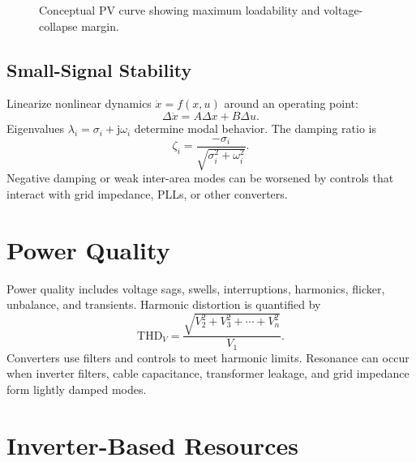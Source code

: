 \documentclass[11pt]{article}
\newcommand{\junit}{\mathrm{j}}
\begin{document}
\begin{figure}[h]
\centering
{}
\caption{Conceptual PV curve showing maximum loadability and voltage-collapse margin.}
\end{figure}

\subsection{Small-Signal Stability}
Linearize nonlinear dynamics $\dot{x}=f(x,u)$ around an operating point:
\begin{equation}
\Delta \dot{x}=A\Delta x+B\Delta u.
\end{equation}
Eigenvalues $\lambda_i=\sigma_i+\junit \omega_i$ determine modal behavior.
The damping ratio is
\begin{equation}
\zeta_i=\frac{-\sigma_i}{\sqrt{\sigma_i^2+\omega_i^2}}.
\end{equation}
Negative damping or weak inter-area modes can be worsened by controls that
interact with grid impedance, PLLs, or other converters.

\section{Power Quality}

Power quality includes voltage sags, swells, interruptions, harmonics, flicker,
unbalance, and transients. Harmonic distortion is quantified by
\begin{equation}
\mathrm{THD}_V=\frac{\sqrt{V_2^2+V_3^2+\cdots+V_n^2}}{V_1}.
\end{equation}
Converters use filters and controls to meet harmonic limits. Resonance can occur
when inverter filters, cable capacitance, transformer leakage, and grid
impedance form lightly damped modes.

\section{Inverter-Based Resources}
\end{document}
